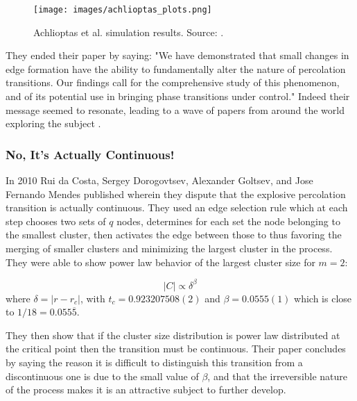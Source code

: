 \begin{figure}[H]
	\centering
	\texttt{[image: images/achlioptas\_plots.png]}
	\caption{Achlioptas et al. simulation results. Source: \cite{Achlioptas_1}.}
	\label{fig:achlioptas_plots}
\end{figure}

They ended their paper by saying: "We have demonstrated that small changes in edge formation have the ability to fundamentally alter the nature of percolation transitions. Our findings call for the comprehensive study of this phenomenon, and of its potential use in bringing phase transitions under control."
Indeed their message seemed to resonate, leading to a wave of papers from around the world exploring the subject \cite{Ziff_1, Cho_1, Radicchi_1, Friedman_1, Ziff_2, Radicchi_2, D_Souza_1, da_Costa_1, Rozenfeld_1, Araujo_1, Moreira_1, Cho_2, Cho_3, Nagler_1, Manna_1, Grassberger_1, Lee_1, Riordan_1, Hooyberghs_1, Nagler_2, Chen_1, Panagiotou_1, Pan_1, Cho_4, Gomez_1, Tian_1, Riordan_2, Riordan_3, Boettcher_1, Chen_2, Angst_1, Bizhani_1, Cho_5, Schroeder_1, Chen_3, Chen_4, Squires_1, Do_1, Chen_5, Bastas_1, Cho_6, da_Costa_2, Riordan_4, Guan_1, da_Costa_5, da_Costa_3, da_Costa_4, D_Souza_2, Hayasaka_1, Clusella_1, Boccaletti_1, Gedik_1, Rahman_1, Waagen_1, Zhu_1, Sabbir_1, Trevelyan_1, Sabbir_1}.



\subsubsection{No, It's Actually Continuous!}
In 2010 Rui da Costa, Sergey Dorogovtsev, Alexander Goltsev, and Jose Fernando Mendes published \cite{da_Costa_1} wherein they dispute that the explosive percolation transition is actually continuous.
They used an edge selection rule which at each step chooses two sets of $q$ nodes, determines for each set the node belonging to the smallest cluster, then activates the edge between those to thus favoring the merging of smaller clusters and minimizing the largest cluster in the process.
They were able to show power law behavior of the largest cluster size for $m = 2$:

\begin{equation}
	|C| \propto \delta^\beta
\end{equation}
where $\delta = |r - r_c|$, with $t_c = 0.923207508(2)$ and $\beta = 0.0555(1)$ which is close to $1/18 = 0.055\overline{5}$.

They then show that if the cluster size distribution is power law distributed at the critical point then the transition must be continuous.
Their paper concludes by saying the reason it is difficult to distinguish this transition from a discontinuous one is due to the small value of $\beta$, and that the irreversible nature of the process makes it is an attractive subject to further develop.



